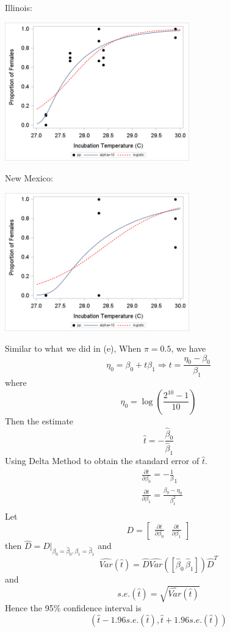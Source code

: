 \documentclass{article}
\begin{document}
\begin{enumerate}[leftmargin = 0 em, label = \arabic*., font = \bfseries]
\begin{enumerate}
	Illinois:
	\begin{center}
		\includegraphics[width = 0.6\textwidth]{SGPlot4il.png}
	\end{center}

	New Mexico:
	\begin{center}
		\includegraphics[width = 0.6\textwidth]{SGPlot3nm.png}
	\end{center}

	Similar to what we did in (e),
	When $\pi = 0.5$, we have
	\[\eta_0 = \beta_0 + t \beta_1 \Rightarrow t = \frac{\eta_0 - \beta_0}{\beta_1}\]
	where 
	\[\eta_0 = \log\left(\frac{2^{10}  -1}{10}\right)\]
	Then the estimate
	\[\hat{t} = -\frac{\hat{\beta}_0}{\hat{\beta}_1}\]
	Using Delta Method to obtain the standard error of $\hat{t}$.
	\begin{align*}
	 & \frac{\partial t}{\partial \beta_0} = -\frac{1}{\beta}_1\\
	 & \frac{\partial t}{\partial \beta_1} = \frac{\beta_0 - \eta_0}{\beta_1^2}\\
	 \end{align*}
	 Let
	 \[D = \begin{bmatrix}
	 	\frac{\partial t}{\partial \beta_0} & \frac{\partial t}{\partial \beta_1}
	 \end{bmatrix}\]
	 then $\hat{D} = D|_{\beta_0= \hat{\beta}_0, \beta_1 = \hat{\beta}_1}$ and
	 \[\widehat{Var}(\hat{t}) = \hat{D}\widehat{Var}([\hat{\beta}_0\, \hat{\beta}_1])\hat{D}^T \]
	 and
	 \[s.e.(\hat{t}) = \sqrt{\widehat{Var}(\hat{t})}\]
	 Hence the 95\% confidence interval is
	 \[(\hat{t} - 1.96 s.e.(\hat{t}), \hat{t} + 1.96 s.e.(\hat{t}))\]


\end{enumerate}
\end{enumerate}
\end{document}
